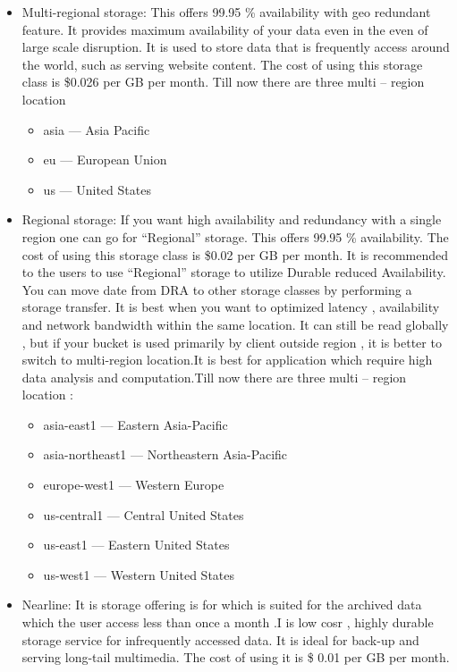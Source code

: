 \documentclass[9pt,twocolumn,twoside]{styles/osajnl}
\begin{document}
\begin{itemize}

\item Multi-regional storage:
This offers 99.95 \% availability with geo redundant feature. It provides maximum availability of your data even in the even of large scale disruption. It is used to store data that is frequently access around the world, such as serving website content. The cost of using this storage class is \$0.026 per GB per month. Till now there are three multi – region location 
		\begin{itemize}

			\item asia — Asia Pacific
			\item eu — European Union
			\item us — United States

		\end{itemize}
		
\item Regional storage:
If you want high availability and redundancy with a single region one can go for “Regional”  storage. This offers 99.95 \% availability. The cost of using this storage class is \$0.02 per GB per month. It is recommended to the users to use “Regional”  storage to utilize Durable  reduced  Availability. You can move date from DRA to other storage classes by performing a storage transfer. It is best when you want to optimized latency , availability and network bandwidth within the same location. It can still be read globally , but if your bucket is used primarily by client outside region , it is better to switch to multi-region location.It is best for application which require high data analysis and computation.Till now there are three multi – region location :

		\begin{itemize}

			\item asia-east1 — Eastern Asia-Pacific
			\item asia-northeast1 — Northeastern Asia-Pacific
			\item europe-west1 — Western Europe
			\item us-central1 — Central United States
			\item us-east1 — Eastern United States
			\item us-west1 — Western United States

		\end{itemize}

\item Nearline:
It is storage offering is for which is suited for the archived data which the user access less than once a month .I is low cosr , highly durable storage service for infrequently accessed data. It is ideal for back-up and serving long-tail multimedia. The cost of using it is \$ 0.01 per GB per month. 



\end{itemize}
\end{document}
